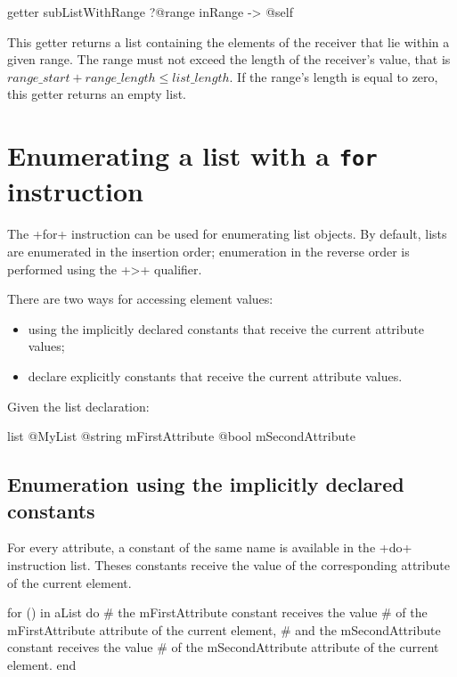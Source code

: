 \begin{galgas}
getter subListWithRange
  ?@range inRange
  -> @self
\end{galgas}

This getter returns a list containing the elements of the receiver that lie within a given range. The range must not exceed the length of the receiver's value, that is $range\_start + range\_length \leqslant list\_length$. If the range's length is equal to zero, this getter returns an empty list.















\section{Enumerating a list with a \texttt{for} instruction}

The \ggs+for+ instruction can be used for enumerating list objects. By default, lists are enumerated in the insertion order; enumeration in the reverse order is performed using the \ggs+>+ qualifier.

There are two ways for accessing element values:
\begin{itemize}
\item using the implicitly declared constants that receive the current attribute values;
\item declare explicitly constants that receive the current attribute values.
\end{itemize}

Given the list declaration:

\begin{galgas}
list @MyList {
  @string mFirstAttribute
  @bool mSecondAttribute
}
\end{galgas}

\subsection{Enumeration using the implicitly declared constants}

For every attribute, a constant of the same name is available in the \ggs+do+ instruction list. Theses constants receive the value of the corresponding attribute of the current element.

\begin{galgas}
for () in aList do
  # the mFirstAttribute constant receives the value
  # of the mFirstAttribute attribute of the current element,
  # and the mSecondAttribute constant receives the value
  # of the mSecondAttribute attribute of the current element.
end
\end{galgas}

